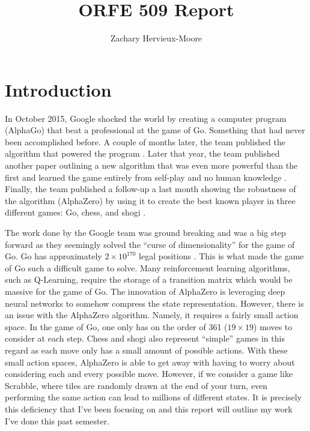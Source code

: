 \documentclass{article}
\title{ORFE 509 Report}
\author{Zachary Hervieux-Moore}
\date{\displaydate{date}}
\begin{document}
  \maketitle

  \clearpage

  \tableofcontents
  \listoffigures

  \clearpage
  
  \section{Introduction}

  In October 2015, Google shocked the world by creating a computer program (AlphaGo) that beat a professional at the game of Go. Something that had never been accomplished before. A couple of months later, the team published the algorithm that powered the program \cite{silver_mastering_2016}. Later that year, the team published another paper outlining a new algorithm that was even more powerful than the first and learned the game entirely from self-play and no human knowledge \cite{silver_mastering_2017}. Finally, the team published a follow-up a last month showing the robustness of the algorithm (AlphaZero) by using it to create the best known player in three different games: Go, chess, and shogi \cite{silver_mastering_2017-1}.

  The work done by the Google team was ground breaking and was a big step forward as they seemingly solved the ``curse of dimensionality'' for the game of Go. Go has approximately $2 \times 10^{170}$ legal positions \cite{tromp_sequence_2016}. This is what made the game of Go such a difficult game to solve. Many reinforcement learning algorithms, such as Q-Learning, require the storage of a transition matrix which would be massive for the game of Go. The innovation of AlphaZero is leveraging deep neural networks to somehow compress the state representation. However, there is an issue with the AlphaZero algorithm. Namely, it requires a fairly small action space. In the game of Go, one only has on the order of 361 ($19 \times 19$) moves to consider at each step. Chess and shogi also represent ``simple'' games in this regard as each move only has a small amount of possible actions. With these small action spaces, AlphaZero is able to get away with having to worry about considering each and every possible move. However, if we consider a game like Scrabble, where tiles are randomly drawn at the end of your turn, even performing the same action can lead to millions of different states. It is precisely this deficiency that I've been focusing on and this report will outline my work I've done this past semester.
\end{document}
